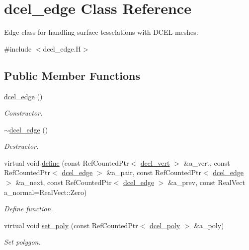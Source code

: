 \hypertarget{classdcel__edge}{}\section{dcel\+\_\+edge Class Reference}
\label{classdcel__edge}


Edge class for handling surface tesselations with D\+C\+EL meshes.  




{\ttfamily \#include $<$dcel\+\_\+edge.\+H$>$}

\subsection*{Public Member Functions}
\begin{DoxyCompactItemize}
\item 
\hyperlink{classdcel__edge_a4c8276de8892c1bea38d7263a75bddbd}{dcel\+\_\+edge} ()
\begin{DoxyCompactList}\small\item\em Constructor. \end{DoxyCompactList}\item 
\hyperlink{classdcel__edge_ab5af1cf4c154e120197cd32b6c8a3b81}{$\sim$dcel\+\_\+edge} ()
\begin{DoxyCompactList}\small\item\em Destructor. \end{DoxyCompactList}\item 
virtual void \hyperlink{classdcel__edge_a2b50803846b893b6ab98f7d2b7a165d8}{define} (const Ref\+Counted\+Ptr$<$ \hyperlink{classdcel__vert}{dcel\+\_\+vert} $>$ \&a\+\_\+vert, const Ref\+Counted\+Ptr$<$ \hyperlink{classdcel__edge}{dcel\+\_\+edge} $>$ \&a\+\_\+pair, const Ref\+Counted\+Ptr$<$ \hyperlink{classdcel__edge}{dcel\+\_\+edge} $>$ \&a\+\_\+next, const Ref\+Counted\+Ptr$<$ \hyperlink{classdcel__edge}{dcel\+\_\+edge} $>$ \&a\+\_\+prev, const Real\+Vect a\+\_\+normal=Real\+Vect\+::\+Zero)
\begin{DoxyCompactList}\small\item\em Define function. \end{DoxyCompactList}\item 
virtual void \hyperlink{classdcel__edge_a8699d7d225c0d51d61f8a00fb336ced1}{set\+\_\+poly} (const Ref\+Counted\+Ptr$<$ \hyperlink{classdcel__poly}{dcel\+\_\+poly} $>$ \&a\+\_\+poly)
\begin{DoxyCompactList}\small\item\em Set polygon. \end{DoxyCompactList}\item 

\end{DoxyCompactItemize}
